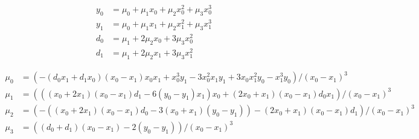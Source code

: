 \begin{align}
  y_0 & = \mu_0+\mu_1 x_0+\mu_2 x_0^{2}+\mu_3 x_0^{3}  \\
   y_1 & = \mu_0+\mu_1 x_1+\mu_2 x_1^{2}+\mu_3 x_1^{3}  \\
   d_0 & =  \mu_1+2 \mu_2 x_0+3 \mu_3 x_0^{2}  \\
   d_1 & = \mu_1+2 \mu_2 x_1+3 \mu_3 x_1^{2}  
\end{align}

 
\begin{align}
  \mu_0 & =  \left(  -  \left( d_0 x_1+d_1 x_0 \right)   \left( x_0 - x_1 \right)  x_0 x_1+x_0^{3} y_1 - 3  x_0^{2} x_1 y_1+3 x_0 x_1^{2} y_0 - x_1^{3} y_0 \right)  /  \left( x_0 - x_1 \right) ^{3}  \\
   \mu_1  & =  \left(  \left(  \left( x_0+2 x_1 \right)   \left( x_0 - x_1 \right)  d_1 - 6  \left( y_0 - y_1  \right)  x_1 \right)  x_0+ \left( 2 x_0+x_1 \right)   \left( x_0 - x_1 \right)  d_0 x_1  \right)  /  \left( x_0 - x_1 \right) ^{3}  \\
   \mu_2 & =  \left(  -  \left(  \left( x_0+2 x_1 \right)    \left( x_0 - x_1 \right)  d_0 - 3  \left( x_0+x_1 \right)   \left( y_0 - y_1 \right)  \right)  -   \left( 2 x_0+x_1 \right)   \left( x_0 - x_1 \right)  d_1 \right)  /  \left( x_0 - x_1 \right) ^{3}   \\
   \mu_3 & =  \left(  \left( d_0+d_1 \right)   \left( x_0 - x_1 \right)  - 2  \left( y_0 - y_1 \right)   \right)  /  \left( x_0 - x_1 \right) ^{3}  
\end{align}
